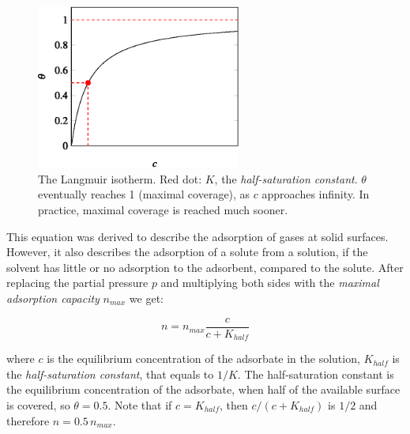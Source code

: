 \begin{figure}
\centering
\includegraphics[width=0.6\textwidth]{fig/langmuir.eps}
\caption{The Langmuir isotherm. Red dot: $K$, the \emph{half-saturation constant}. $\theta$ eventually reaches 1 (maximal coverage), as $c$ approaches infinity. In practice, maximal coverage is reached much sooner.}
\label{fig:langmuir}
\end{figure}

This equation was derived to describe the adsorption of gases at solid surfaces. However, it also describes the adsorption of a solute from a solution, if the solvent has little or no adsorption to the adsorbent, compared to the solute. After replacing the partial pressure $p$ and multiplying both sides with the \emph{maximal adsorption capacity} $n_{max}$ we get:

\begin{equation}
\label{eq:langmuir2}
        n
        =
        n_{max}
	\frac
                {c}
                {c + K_{half}} 
\end{equation}

where $c$ is the equilibrium concentration of the adsorbate in the solution, $K_{half}$ is the \emph{half-saturation constant}, that equals to $1/K$. The half-saturation constant is the equilibrium concentration of the adsorbate, when half of the available surface is covered, so $\theta = 0.5$. Note that if $c = K_{half}$, then $c/(c + K_{half})$ is $1/2$ and therefore $n = 0.5\, n_{max}$. 

